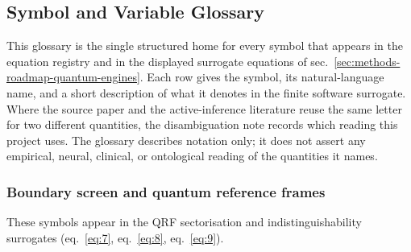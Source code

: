 \documentclass[
]{article}
\begin{document}
\subsection{Symbol and Variable
Glossary}\label{sec:supplement-symbol-glossary}

This glossary is the single structured home for every symbol that
appears in the equation registry and in the displayed surrogate
equations of sec.~\ref{sec:methods-roadmap-quantum-engines}. Each row
gives the symbol, its natural-language name, and a short description of
what it denotes in the finite software surrogate. Where the source paper
and the active-inference literature reuse the same letter for two
different quantities, the disambiguation note records which reading this
project uses. The glossary describes notation only; it does not assert
any empirical, neural, clinical, or ontological reading of the
quantities it names.

\subsubsection{Boundary screen and quantum reference
frames}\label{boundary-screen-and-quantum-reference-frames}

These symbols appear in the QRF sectorisation and indistinguishability
surrogates (eq.~\ref{eq:7}, eq.~\ref{eq:8}, eq.~\ref{eq:9}).
\end{document}
